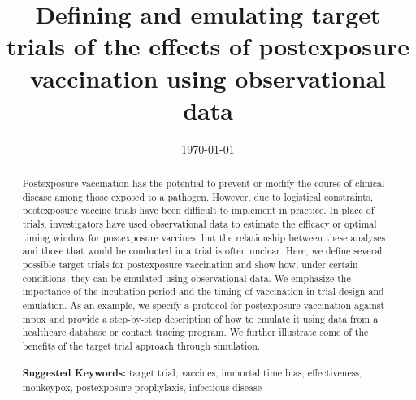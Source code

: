 \documentclass[11pt]{article}
\begin{document}
\begin{titlepage}
\title{Defining and emulating target trials of the effects of postexposure vaccination using observational data}
\author{ }
\date{\today}
\maketitle

\begin{abstract}
Postexposure vaccination has the potential to prevent or modify the course of clinical disease among those exposed to a pathogen. However, due to logistical constraints, postexposure vaccine trials have been difficult to implement in practice. In place of trials, investigators have used observational data to estimate the efficacy or optimal timing window for postexposure vaccines, but the relationship between these analyses and those that would be conducted in a trial is often unclear. Here, we define several possible target trials for postexposure vaccination and show how, under certain conditions, they can be emulated using observational data. We emphasize the importance of the incubation period and the timing of vaccination in trial design and emulation. As an example, we specify a protocol for postexposure vaccination against mpox and provide a step-by-step description of how to emulate it using data from a healthcare database or contact tracing program. We further illustrate some of the benefits of the target trial approach through simulation.
\noindent \\
\vspace{0in} \\
\noindent\textbf{Suggested Keywords:} target trial, vaccines, immortal time bias, effectiveness, monkeypox, postexposure prophylaxis, infectious disease \\
\end{abstract}
\setcounter{page}{0}
\thispagestyle{empty}
\end{titlepage}
\pagebreak \newpage
\doublespacing

\end{document}
